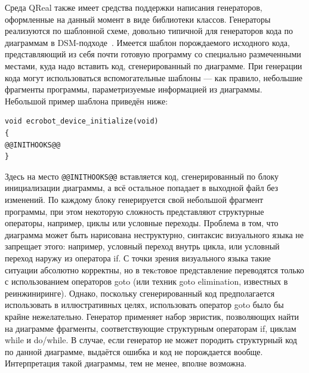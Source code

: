 \documentclass[a4paper]{article}
\begin{document}
Среда QReal также имеет средства поддержки написания генераторов, оформленные на данный момент в виде библиотеки классов. Генераторы реализуются по шаблонной схеме, довольно типичной для генераторов кода по диаграммам в DSM-подходе~\cite{theBook}. Имеется шаблон порождаемого исходного кода, представляющий из себя почти готовую программу со специально размеченными местами, куда надо вставить код, сгенерированный по диаграмме. При генерации кода могут использоваться вспомогательные шаблоны --- как правило, небольшие фрагменты программы, параметризуемые информацией из диаграммы. Небольшой пример шаблона приведён ниже:
\begin{verbatim}
void ecrobot_device_initialize(void)
{
@@INITHOOKS@@
}
\end{verbatim}
Здесь на место \verb|@@INITHOOKS@@| вставляется код, сгенерированный по блоку инициализации диаграммы, а всё остальное попадает в выходной файл без изменений. По каждому блоку генерируется свой небольшой фрагмент программы, при этом некоторую сложность представляют структурные операторы, например, циклы или условные переходы. Проблема в том, что диаграмма может быть нарисована неструктурно, синтаксис визуального языка не запрещает этого: например, условный переход внутрь цикла, или условный переход наружу из оператора if. С точки зрения визуального языка такие ситуации абсолютно корректны, но в текcтовое представление переводятся только с использованием операторов goto (или техник goto elimination, известных в реинжиниринге). Однако, поскольку сгенерированный код предполагается использовать в иллюстративных целях, использовать оператор goto было бы крайне нежелательно. Генератор применяет набор эвристик, позволяющих найти на диаграмме фрагменты, соответствующие структурным операторам if, циклам while и do/while. В случае, если генератор не может породить структурный код по данной диаграмме, выдаётся ошибка и код не порождается вообще. Интерпретация такой диаграммы, тем не менее, вполне возможна.
\end{document}
